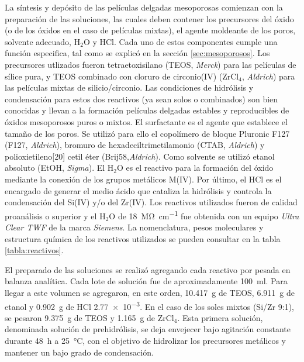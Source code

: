 			La síntesis y depósito de las películas delgadas mesoporosas comienzan con la preparación de las soluciones, las cuales deben contener los precursores del óxido (o de los óxidos en el caso de películas mixtas), el agente moldeante de los poros, solvente adecuado, H$_2$O y HCl\cite{Brinker1990}. Cada uno de estos componentes cumple una función especifica, tal como se explicó en la sección \ref{sec:mesoporosos}. Los precursores utlizados fueron tetraetoxisilano (TEOS, \textit{Merck}) para las películas de sílice pura, y TEOS combinado con cloruro de circonio(IV) (ZrCl$_4$, \textit{Aldrich}) para las películas mixtas de silicio/circonio. Las condiciones de hidrólisis y condensación para estos dos reactivos (ya sean solos o combinados) son bien conocidas y llevan a la formación películas delgadas estables y reproducibles de óxidos mesoporosos puros o mixtos\cite{Soler-Illia2004,Crepaldi2002a,Angelome2008}. El surfactante es el agente que establece el tamaño de los poros. Se utilizó para ello el copolímero de bloque Pluronic F127 (F127, \textit{Aldrich}), bromuro de hexadeciltrimetilamonio (CTAB, \textit{Aldrich}) y polioxietileno[20] cetil éter (Brij58,\textit{Aldrich}). Como solvente se utilizó etanol absoluto (EtOH, \textit{Sigma}). El H$_2$O es el reactivo para la formación del óxido mediante la conexión de los grupos metálicos M(IV). Por último, el HCl es el encargado de generar el medio ácido que cataliza la hidrólisis y controla la condensación del Si(IV) y/o del Zr(IV). Los reactivos utilizados fueron de calidad proanálisis o superior y el H$_2$O de \SI{18}{\mega\ohm\per\cm} fue obtenida con un equipo \textit{Ultra Clear TWF} de la marca \textit{Siemens}. La nomenclatura, pesos moleculares y estructura química de los reactivos utilizados se pueden consultar en la tabla \ref{tabla:reactivos}.
					
			El preparado de las soluciones se realizó agregando cada reactivo por pesada en balanza analítica. Cada lote de solución fue de aproximadamente \SI{100}{\ml}. Para llegar a este volumen se agregaron, en este orden, \SI{10.417}{\gram} de TEOS, \SI{6.911}{\gram} de etanol y \SI{0.902}{\gram} de HCl \SI{2,77e-3}{\Molar}. En el caso de los soles mixtos (Si/Zr 9:1), se pesaron \SI{9.375}{\gram} de TEOS y \SI{1.165}{\gram} de ZrCl$_4$. Esta primera solución, denominada solución de prehidrólisis, se deja envejecer bajo agitación constante durante \SI{48}{\hour} a \SI{25}{\celsius}, con el objetivo de hidrolizar los precursores metálicos y mantener un bajo grado de condensación.\cite{Grosso2001}

